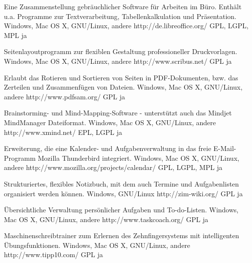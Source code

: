 \documentclass[11pt,a4paper,landscape,twocolumn]{article}
\begin{document}


{Eine Zusammenstellung gebräuchlicher Software für Arbeiten im Büro. Enthält u.a. Programme zur Textverarbeitung, Tabellenkalkulation und Präsentation.}
{Windows, Mac OS X, GNU/Linux, andere}
{http://de.libreoffice.org/}
{GPL, LGPL, MPL}
{ja}

{Seitenlayoutprogramm zur flexiblen Gestaltung professioneller Druckvorlagen.}
{Windows, Mac OS X, GNU/Linux, andere}
{http://www.scribus.net/}
{GPL}
{ja}

{Erlaubt das Rotieren und Sortieren von Seiten in PDF-Dokumenten, bzw. das Zerteilen und Zusammenfügen von Dateien.}
{Windows, Mac OS X, GNU/Linux, andere}
{http://www.pdfsam.org/}
{GPL}
{ja}

{Brainstorming- und Mind-Mapping-Software - unterstützt auch das Mindjet MindManager Dateiformat.}
{Windows, Mac OS X, GNU/Linux, andere}
{http://www.xmind.net/}
{EPL, LGPL}
{ja}


\newpage %


{Erweiterung, die eine Kalender- und Aufgabenverwaltung in das freie E-Mail-Programm Mozilla Thunderbird integriert.}
{Windows, Mac OS X, GNU/Linux, andere}
{http://www.mozilla.org/projects/calendar/}
{GPL, LGPL, MPL}
{ja}

{Strukturiertes, flexibles Notizbuch, mit dem auch Termine und Aufgabenlisten organisiert werden können.}
{Windows, GNU/Linux}
{http://zim-wiki.org/}
{GPL}
{ja}

{Übersichtliche Verwaltung persönlicher Aufgaben und To-do-Listen.}
{Windows, Mac OS X, GNU/Linux, andere}
{http://www.taskcoach.org/}
{GPL}
{ja}

{Maschinenschreibtrainer zum Erlernen des Zehnfingersystems mit intelligenten Übungsfunktionen.}
{Windows, Mac OS X, GNU/Linux, andere}
{http://www.tipp10.com/}
{GPL}
{ja}
\end{document}
